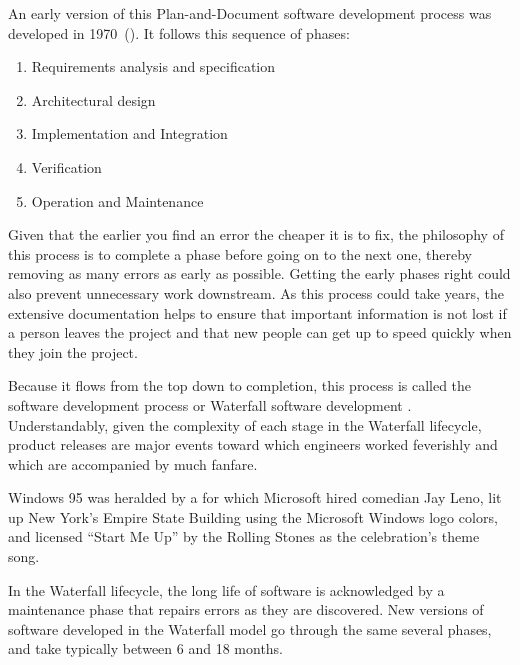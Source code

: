 An early version of this Plan-and-Document software development process
was developed in 1970~(\cite{Royce70}). It follows this sequence of
phases:
\begin{enumerate}

\item Requirements analysis and specification

\item Architectural design

\item Implementation and Integration

\item Verification

\item Operation and Maintenance

\end{enumerate}

Given that the earlier you find an error the cheaper it is to fix, the philosophy of this process is to complete a phase before going on to the next one, thereby removing as many errors as early as possible. Getting the early phases right could also prevent unnecessary work downstream. As this process could take years, the extensive documentation helps to ensure that important information is not lost if a person leaves the project and that new people can get up to speed quickly when they join the project.

Because it flows from the top down to completion, this process is called
the  software development process or
Waterfall software development .
Understandably, given the complexity of each stage in the Waterfall
lifecycle, product releases are major events toward which engineers
worked feverishly and which are accompanied by much fanfare.
\begin{sidebar}[-0.6in]{Windows 95}
   was heralded by a
   for which Microsoft hired comedian Jay Leno,
  lit up New York's Empire State Building using the Microsoft
  Windows logo colors, and licensed ``Start Me Up'' by the
  Rolling Stones as the celebration's theme song.
\end{sidebar}

In the Waterfall lifecycle, the long life of software is acknowledged by
a maintenance phase that repairs errors as they are discovered. New
versions of software developed in the Waterfall model go through the
same several phases, and take typically between 6 and 18 months.

